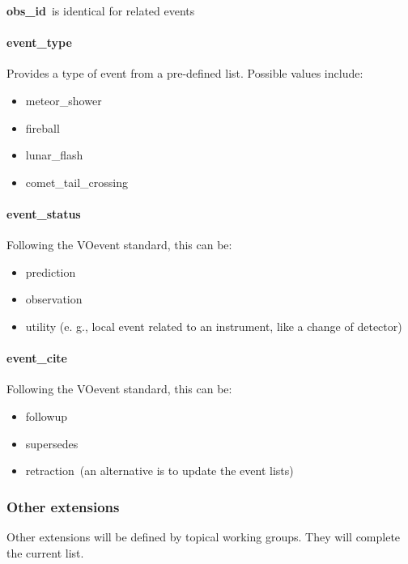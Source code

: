 \documentclass[11pt,a4paper]{ivoa}
\begin{document}
\textbf{obs\_id} is identical for related events

\paragraph{event\_type}

Provides a type of event from a pre-defined list. Possible values include:

\begin{itemize}
\item meteor\_shower
\item fireball
\item lunar\_flash
\item comet\_tail\_crossing
\end{itemize}

\paragraph{event\_status}

Following the VOevent standard, this can be:

\begin{itemize}
\item prediction
\item observation
\item utility (e. g., local event related to an instrument, like a change of detector)
\end{itemize}

\paragraph{event\_cite}

Following the VOevent standard, this can be:

\begin{itemize}
\item followup
\item supersedes
\item retraction (an alternative is to update the event lists)
\end{itemize}

\subsubsection{Other extensions\\}

Other extensions will be defined by topical working groups. They will complete the current list.
\end{document}
